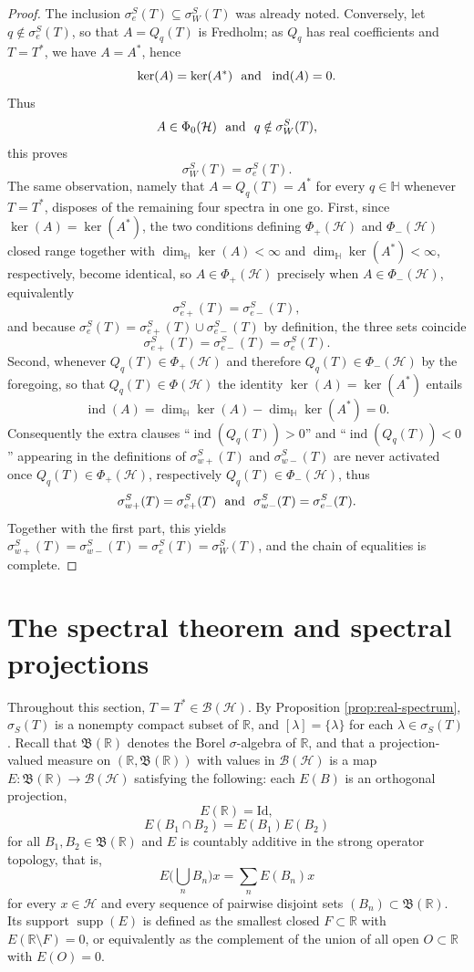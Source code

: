 \documentclass[12pt,a4paper]{article}
\theoremstyle{plain}
\theoremstyle{definition}
\theoremstyle{remark}
\newcommand{\HH}{\mathbb H}
\newcommand{\RR}{\mathbb R}
\newcommand{\BB}{\mathcal B}
\newcommand{\Bor}{\mathfrak B}
\newcommand{\Id}{\mathrm{Id}}
\newcommand{\HS}{\mathcal H}
\newcommand{\dimH}{\dim_{\HH}}
\newcommand{\sigS}{\sigma_S}
\newcommand{\sigeS}{\sigma_{e}^{S}}
\newcommand{\sigwS}{\sigma_{W}^{S}}
\newcommand{\sigeuS}{\sigma_{e+}^{S}}
\newcommand{\sigedS}{\sigma_{e-}^{S}}
\newcommand{\sigwuS}{\sigma_{w+}^{S}}
\newcommand{\sigwdS}{\sigma_{w-}^{S}}
\DeclareMathOperator{\ind}{ind}
\DeclareMathOperator{\supp}{supp}
\begin{document}
{\begin{proof}
The inclusion $\sigeS(T)\subseteq\sigwS(T)$ was already noted.
Conversely, let $q\notin\sigeS(T)$, so that $A=Q_q(T)$ is Fredholm; as
$Q_q$ has real coefficients and $T=T^*$, we have $A=A^*$, hence
$$\ker(A)=\ker(A^*) ~~\hbox{and} ~~\ind(A)=0.$$ Thus $$A\in\Phi_0(\HS)~~\hbox{and} ~~q\notin\sigwS(T),$$ this proves $$\sigwS(T)=\sigeS(T).$$
The same observation, namely that $A=Q_q(T)=A^*$ for every $q\in\HH$
whenever $T=T^*$, disposes of the remaining four spectra in one go.
First, since $\ker(A)=\ker(A^*)$, the two conditions defining
$\Phi_+(\HS)$ and $\Phi_-(\HS)$ closed range together with
$\dimH\ker(A)<\infty$ and $\dimH\ker(A^*)<\infty$, respectively,
become identical, so $A\in\Phi_+(\HS)$ precisely when
$A\in\Phi_-(\HS)$, equivalently $$\sigeuS(T)=\sigedS(T),$$ and because
$\sigeS(T)=\sigeuS(T)\cup\sigedS(T)$ by definition, the three sets
coincide $$\sigeuS(T)=\sigedS(T)=\sigeS(T).$$ Second, whenever
$Q_q(T)\in\Phi_+(\HS)$ and therefore $Q_q(T)\in\Phi_-(\HS)$ by the
foregoing, so that $Q_q(T)\in\Phi(\HS)$ the identity
$\ker(A)=\ker(A^*)$ entails
$$\ind(A)=\dimH\ker(A)-\dimH\ker(A^*)=0.$$ Consequently the extra clauses
``$\ind(Q_q(T))>0$'' and ``$\ind(Q_q(T))<0$'' appearing in the
definitions of $\sigwuS(T)$ and $\sigwdS(T)$ are never activated once
$Q_q(T)\in\Phi_+(\HS)$, respectively $Q_q(T)\in\Phi_-(\HS)$, thus
$$\sigwuS(T)=\sigeuS(T) ~~\hbox{and}~~ \sigwdS(T)=\sigedS(T).$$ Together with the
first part, this yields
$\sigwuS(T)=\sigwdS(T)=\sigeS(T)=\sigwS(T)$, and the chain of
equalities is complete.
\end{proof}

\section{The spectral theorem and spectral projections}
\label{sec:spectral}

Throughout this section, $T=T^*\in\BB(\HS)$. By Proposition
\ref{prop:real-spectrum}, $\sigS(T)$ is a nonempty compact subset of
$\RR$, and $[\lambda]=\{\lambda\}$ for each $\lambda\in\sigS(T)$.
Recall that $\Bor(\RR)$ denotes the Borel $\sigma$-algebra of $\RR$,
and that a projection-valued measure on $(\RR,\Bor(\RR))$ with
values in $\BB(\HS)$ is a map $E:\Bor(\RR)\to\BB(\HS)$ satisfying the
following: each $E(B)$ is an orthogonal projection, $$E(\RR)=\Id,$$
$$E(B_1\cap B_2)=E(B_1)E(B_2)$$ for all $B_1,B_2\in\Bor(\RR)$ and $E$
is countably additive in the strong operator topology, that is,
$$E\big(\bigcup_nB_n\big)x=\sum_nE(B_n)x$$ for every $x\in\HS$ and every
sequence of pairwise disjoint sets $(B_n)\subset\Bor(\RR)$. Its
support $\supp(E)$ is defined as the smallest closed
$F\subset\RR$ with $E(\RR\setminus F)=0$, or equivalently as the
complement of the union of all open $O\subset\RR$ with $E(O)=0$.

}
\end{document}
